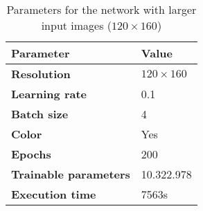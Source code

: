 \begin{table}[h!]
	\footnotesize
	\centering
	\begin{tabular}{ll}
	\hline
		\textbf{Parameter} & \textbf{Value}\\
	\hline
	\hline
		\textbf{Resolution} & $120\times160$\\
		\textbf{Learning rate} & 0.1\\
		\textbf{Batch size} & 4\\
		\textbf{Color} & Yes\\
		\textbf{Epochs} & 200\\
		\textbf{Trainable parameters} & 10.322.978\\
		\textbf{Execution time} & 7563s\\
	\hline
	\end{tabular}
	\caption{Parameters for the network with larger input images ($120\times160$)}
	\label{tab:params_120_network}
\end{table}

